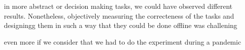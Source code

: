 in more abstract or decision making tasks, we could have observed different results. Nonetheless, objectively measuring the correcteness of the tasks and designingg them in such a way that they could be done offline was challening

even more if we consider that we had to do the experiment during a pandemic

\clearpage




























